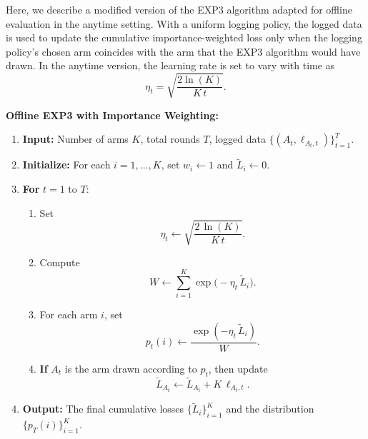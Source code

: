 Here, we describe a modified version of the EXP3 algorithm adapted for offline evaluation in the anytime setting. With a uniform logging policy, the logged data is used to update the cumulative importance-weighted loss only when the logging policy's chosen arm coincides with the arm that the EXP3 algorithm would have drawn. In the anytime version, the learning rate is set to vary with time as 
\[
\eta_t = \sqrt{\frac{2\ln(K)}{K\,t}}.
\]

\textbf{Offline EXP3 with Importance Weighting:}
\begin{enumerate}
  \item \textbf{Input:} Number of arms $K$, total rounds $T$, logged data $\{(A_t,\ell_{A_t,t})\}_{t=1}^T$.
  \item \textbf{Initialize:} For each $i=1,\dots,K$, set $w_i \leftarrow 1$ and $\tilde{L}_i \leftarrow 0$.
  \item \textbf{For} $t = 1$ to $T$:
    \begin{enumerate}
      \item Set 
      \[
      \eta_t \leftarrow \sqrt{\frac{2\,\ln(K)}{K\,t}}.
      \]
      \item Compute 
      \[
      W \leftarrow \sum_{i=1}^K \exp\bigl(-\eta_t\,\tilde{L}_i\bigr).
      \]
      \item For each arm $i$, set 
      \[
      p_t(i) \leftarrow \frac{\exp(-\eta_t\,\tilde{L}_i)}{W}.
      \]
      \item \textbf{If} $A_t$ is the arm drawn according to $p_t$, then update 
      \[
      \tilde{L}_{A_t} \leftarrow \tilde{L}_{A_t} + K\,\ell_{A_t,t}.
      \]
    \end{enumerate}
  \item \textbf{Output:} The final cumulative losses $\{\tilde{L}_i\}_{i=1}^K$ and the distribution $\{p_T(i)\}_{i=1}^K$.
\end{enumerate}
